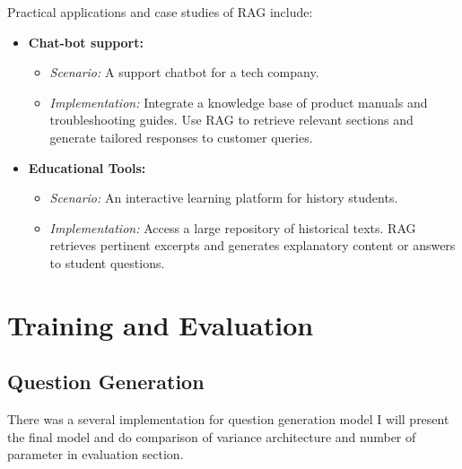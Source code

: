 \newpage
Practical applications and case studies of RAG include:
\begin{itemize}
    \item \textbf{Chat-bot support:}
    \begin{itemize}
        \item \textit{Scenario:} A support chatbot for a tech company.
        \item \textit{Implementation:} Integrate a knowledge base of product manuals and troubleshooting guides. Use RAG to retrieve relevant sections and generate tailored responses to customer queries.
    \end{itemize}
    \item \textbf{Educational Tools:}
    \begin{itemize}
        \item \textit{Scenario:} An interactive learning platform for history students.
        \item \textit{Implementation:} Access a large repository of historical texts. RAG retrieves pertinent excerpts and generates explanatory content or answers to student questions.
    \end{itemize}
    
\end{itemize}

\newpage

\section{Training and Evaluation}
\subsection{Question Generation}

There was a several implementation for question generation model
I will present the final model and do comparison of variance architecture and number of parameter in evaluation section.

